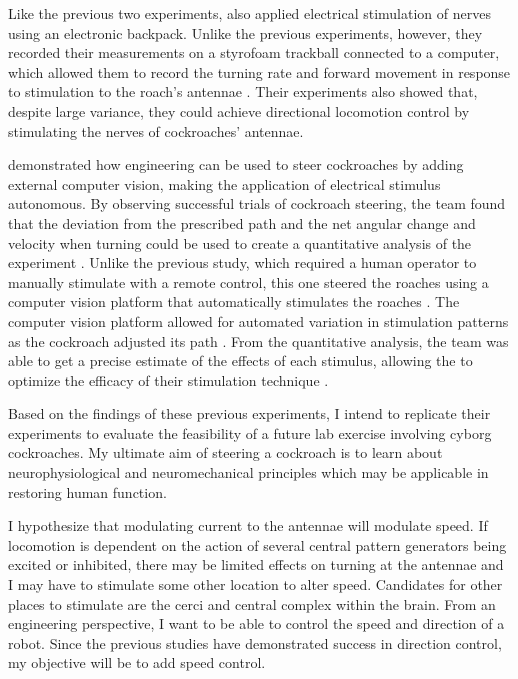 Like the previous two experiments, \citet{holzer1997locomotion} also applied electrical stimulation of nerves using an electronic backpack. Unlike the previous experiments, however, they recorded their measurements on a styrofoam trackball connected to a computer, which allowed them to record the turning rate and forward movement in response to stimulation to the roach's antennae \citep{holzer1997locomotion}. Their experiments also showed that, despite large variance, they could achieve directional locomotion control by stimulating the nerves of cockroaches' antennae.

\citet{whitmire2013kinect} demonstrated how engineering can be used to steer cockroaches by adding external computer vision, making the application of electrical stimulus autonomous. By observing successful trials of cockroach steering, the team found that the deviation from the prescribed path and the net angular change and velocity when turning could be used to create a quantitative analysis of the experiment \citep{whitmire2013kinect}. Unlike the previous study, which required a human operator to manually stimulate with a remote control, this one steered the roaches using a computer vision platform that automatically stimulates the roaches \citep{whitmire2013kinect}. The computer vision platform allowed for automated variation in stimulation patterns as the cockroach adjusted its path \citep{whitmire2013kinect}. From the quantitative analysis, the team was able to get a precise estimate of the effects of each stimulus, allowing the to optimize the efficacy of their stimulation technique \citep{whitmire2013kinect}. 



Based on the findings of these previous experiments, I intend to replicate their experiments to evaluate the feasibility of a future lab exercise involving cyborg cockroaches. My ultimate aim of steering a cockroach is to learn about neurophysiological and neuromechanical principles which may be applicable in restoring human function. 

I hypothesize that modulating current to the antennae will modulate speed. If locomotion is dependent on the action of several central pattern generators being excited or inhibited, there may be limited effects on turning at the antennae and I may have to stimulate some other location to alter speed. 
Candidates for other places to stimulate are the cerci and central complex within the brain. From an engineering perspective, I want to be able to control the speed and direction of a robot. Since the previous studies have demonstrated success in direction control, my objective will be to add speed control.







